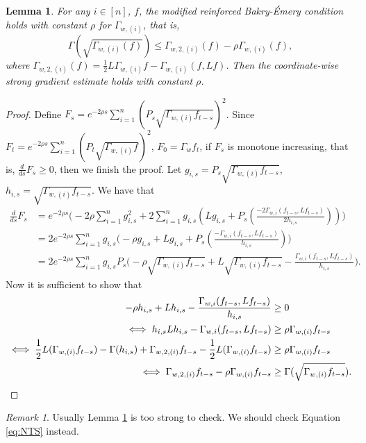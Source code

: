 \documentclass[11pt]{article}
\theoremstyle{plain}
\newtheorem{lemma}[theorem]{Lemma}
\theoremstyle{definition}
\theoremstyle{remark}
\newtheorem{remark}[theorem]{Remark}
\newcommand{\tuple}[1]{\left(#1\right)}
\newcommand{\tp}{\tuple}
\begin{document}
\begin{lemma}\label{lem:cBRE_condition}
    For any $i\in[n]$, $f$, the modified reinforced Bakry-\'Emery condition holds with constant $\rho$ for $\Gamma_{w,(i)}$, that is,
    $$
        \Gamma(\sqrt{\Gamma_{w,(i)}(f)}) \leq \Gamma_{w,2,(i)}(f) - \rho \Gamma_{w,(i)}(f),
    $$
    where $\Gamma_{w,2,(i)}(f) = \frac 12 L \Gamma_{w,(i)} f - \Gamma_{w,(i)}(f,Lf)$.
    Then the coordinate-wise strong gradient estimate holds with constant $\rho$.
\end{lemma}
\begin{proof}
    Define $F_s = e^{-2\rho s}\sum_{i=1}^n \tp{P_{s} \sqrt{\Gamma_{w,(i)}f_{t-s}}}^2$.
    Since $F_t = e^{-2\rho s}\sum_{i=1}^n \tp{P_{t} \sqrt{\Gamma_{w,(i)}f}}^2$, $F_0 = \Gamma_w f_t$, if $F_s$ is monotone increasing, that is, $\frac d{ds}F_s \geq 0$, then we finish the proof.
    Let $g_{i,s} = P_s\sqrt{\Gamma_{w,(i)}f_{t-s}}$, $h_{i,s} = \sqrt{\Gamma_{w,(i)}f_{t-s}}$.
    We have that
    \begin{align}
        \frac d{ds} F_s &= e^{-2\rho s}\Bigg(-2\rho \sum_{i=1}^n g_{i,s}^2 + 2\sum_{i=1}^n g_{i,s}\left(Lg_{i,s} + P_s\left(\frac{-2\Gamma_{w,i}(f_{t-s},Lf_{t-s})}{2h_{i,s}}\right)\right)\Bigg) \nonumber
        \\&=2e^{-2\rho s}\sum_{i=1}^n g_{i,s}\Bigg(-\rho g_{i,s} + Lg_{i,s} + P_s\left(\frac{-\Gamma_{w,i}(f_{t-s},Lf_{t-s})}{h_{i,s}}\right)\Bigg) \nonumber
        \\&= 2e^{-2\rho s}\sum_{i=1}^n g_{i,s}P_s\Bigg(-\rho \sqrt{\Gamma_{w,(i)}f_{t-s}} + L\sqrt{\Gamma_{w,(i)}f_{t-s}} - \frac{\Gamma_{w,i}(f_{t-s},Lf_{t-s})}{h_{i,s}}\Bigg). \label{eq:NTS}
    \end{align}
    Now it is sufficient to show that
    \begin{align*}
        -\rho h_{i,s} + Lh_{i,s} - \frac{\Gamma_{w,i}(f_{t-s},Lf_{t-s})}{h_{i,s}} &\geq 0
       \\\iff h_{i,s}Lh_{i,s} - \Gamma_{w,i}(f_{t-s},Lf_{t-s}) &\geq \rho \Gamma_{w,(i)}f_{t-s}
       \\\iff \frac 12L(\Gamma_{w,(i)}f_{t-s})-\Gamma(h_{i,s})+\Gamma_{w,2,(i)}f_{t-s} - \frac 12L(\Gamma_{w,(i)}f_{t-s}) &\geq \rho \Gamma_{w,(i)}f_{t-s}
       \\\iff \Gamma_{w,2,(i)}f_{t-s} - \rho \Gamma_{w,(i)}f_{t-s} &\geq \Gamma(\sqrt{\Gamma_{w,(i)}f_{t-s}}). \qedhere
    \end{align*}
\end{proof}
\begin{remark}
    Usually Lemma \ref{lem:cBRE_condition} is too strong to check.
    We should check Equation \ref{eq:NTS} instead.
\end{remark}
\end{document}
